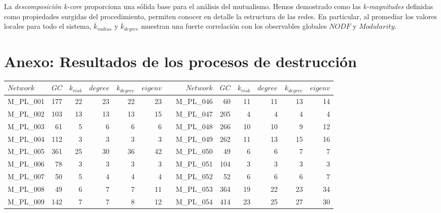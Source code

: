 La \textit{descomposición k-core} proporciona una sólida base para el análisis del mutualismo. Hemos demostrado como las \textit{k-magnitudes} definidas como propiedades surgidas del procedimiento, permiten conocer en detalle la estructura de las redes. En particular, al promediar los valores locales para todo el sistema, $\overline {k}_{radius}$ y $\overline {k}_{degree}$ muestran una fuerte correlación con los observables globales $NODF$ y $Modularity$. 

\clearpage

\section{Anexo: Resultados de los procesos de destrucción}
\label{DES_ANEXO_halfgc}

\begin{table}[htbp]
\fontsize{2.3mm}{2.3mm}\selectfont
  \centering
    \begin{tabular}{lrrrrrrrrrrrr}
    \toprule
    $Network$ & $GC$ & $k_{risk}$ & $degree$ & $k_{degree}$ & $eigenv$ &    &$Network$ & $GC$ & $k_{risk}$ & $degree$ & $k_{degree}$ & $eigenv$ \\
    \midrule
        M\_PL\_001 & 177  & 22   & 23   & 22   & 23   &      & M\_PL\_046 & 60   & 11   & 11   & 13   & 14 \\
    M\_PL\_002 & 103  & 13   & 13   & 13   & 15   &      & M\_PL\_047 & 205  & 4    & 4    & 4    & 4 \\
    M\_PL\_003 & 61   & 5    & 6    & 6    & 6    &      & M\_PL\_048 & 266  & 10   & 10   & 9    & 12 \\
    M\_PL\_004 & 112  & 3    & 3    & 3    & 3    &      & M\_PL\_049 & 262  & 11   & 13   & 15   & 16 \\
    M\_PL\_005 & 361  & 25   & 30   & 36   & 42   &      & M\_PL\_050 & 49   & 6    & 6    & 7    & 7 \\
    M\_PL\_006 & 78   & 3    & 3    & 3    & 3    &      & M\_PL\_051 & 104  & 3    & 3    & 3    & 3 \\
    M\_PL\_007 & 50   & 5    & 4    & 4    & 4    &      & M\_PL\_052 & 52   & 6    & 6    & 6    & 7 \\
    M\_PL\_008 & 49   & 6    & 7    & 7    & 11   &      & M\_PL\_053 & 364  & 19   & 22   & 23   & 34 \\
    M\_PL\_009 & 142  & 7    & 7    & 8    & 12   &      & M\_PL\_054 & 414  & 23   & 25   & 27   & 30 \\

\end{tabular}
\end{table}

